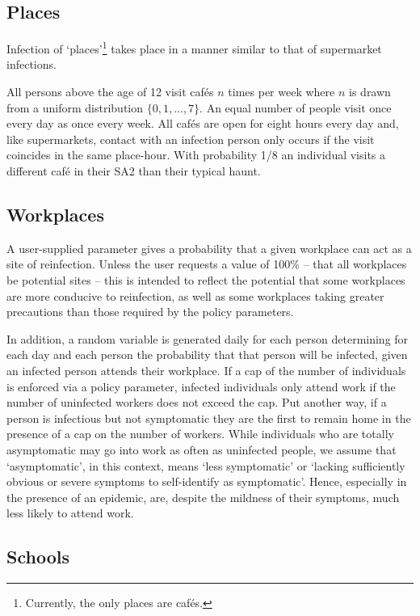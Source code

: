 \documentclass[submission]{grattan}
\begin{document}
\subsection{Places}

Infection of `places'\footnote{Currently, the only places are caf\'{e}s.}
takes place in a manner similar to that of supermarket infections.

All persons above the age of 12 visit caf\'es \(n\)
times per week where \(n\) is drawn from a
uniform distribution \(\{0, 1, \dots, 7\}\). An equal number of people
visit once every day as once every week. All caf\'es are open for eight
hours every day and, like supermarkets, contact with an infection person
only occurs if the visit coincides in the same place-hour. With probability
1/8 an individual visits a different caf\'e in their SA2 than their typical
haunt.

\subsection{Workplaces}

A user-supplied parameter gives a probability that a given workplace can act as a site
of reinfection. Unless the user requests a value of 100\% -- that all workplaces
be potential sites -- this is intended to reflect the potential that some workplaces are more
conducive to reinfection, as well as some workplaces taking greater precautions than those
required by the policy parameters.

In addition, a random variable is generated daily for each person determining for each day
and each person the probability that that person will be infected, given an infected person
attends their workplace. If a cap of the number of individuals is enforced via a policy
parameter, infected individuals only attend work if the number of uninfected workers does
not exceed the cap. Put another way, if a person is infectious but not symptomatic they are
the first to remain home in the presence of a cap on the number of workers. While individuals
who are totally asymptomatic may go into work as often as uninfected people, we assume that
`asymptomatic', in this context, means `less symptomatic' or `lacking sufficiently obvious
or severe symptoms to self-identify as symptomatic'. Hence, especially in the presence
of an epidemic, are, despite the mildness of their symptoms, much less likely to attend work.

\subsection{Schools}
\end{document}
